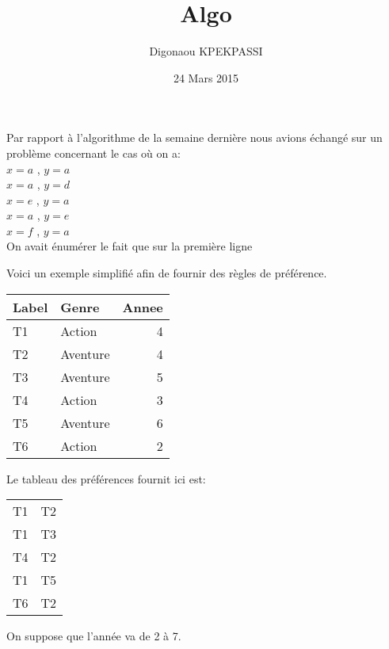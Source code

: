 \documentclass[a4paper]{article}
\title{Algo}
\author{Digonaou KPEKPASSI}
\date{24 Mars 2015}
\begin{document}
Par rapport à l'algorithme de la semaine dernière nous avions échangé sur un problème concernant le cas où on a:\\
$x=a$ , $y=a$\\
$x=a$ , $y=d$\\
$x=e$ , $y=a$\\
$x=a$ , $y=e$\\
$x=f$ , $y=a$\\

On avait énumérer le fait que sur la première ligne

Voici un exemple simplifié afin de fournir des règles de préférence.
\begin{center}
\begin{tabular}{ |l|l|r| } 
\hline
 Label & Genre & Annee\\
 \hline
 \hline
T1	& Action	& 4\\
T2	& Aventure	& 4\\
T3	& Aventure	& 5\\
T4	& Action	& 3\\
T5	& Aventure	& 6\\
T6	& Action &	2\\

 \hline
\end{tabular}
\end{center}


 Le tableau des préférences fournit ici est:	
\begin{center}
\begin{tabular}{ |l|l| } 
T1 & T2\\
T1 & T3\\
T4 & T2\\
T1 & T5\\
T6 & T2\\
\end{tabular}
\end{center}
On suppose que l'année va de 2 à 7.
\end{document}
